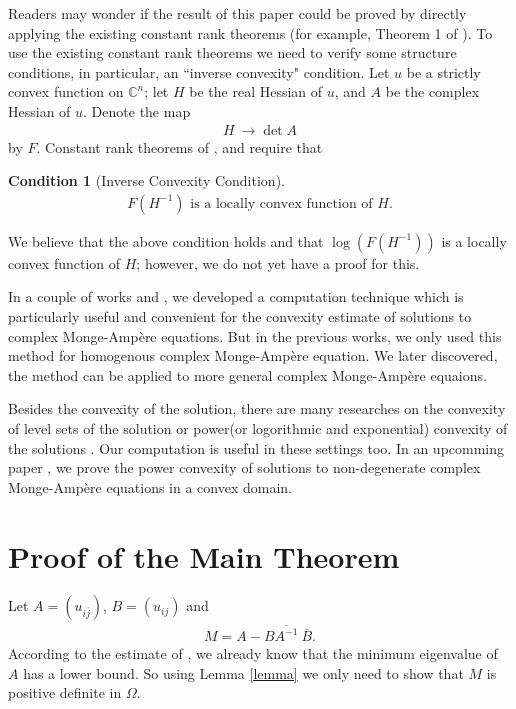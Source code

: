 \documentclass{article}
\numberwithin{equation}{section}
\newtheorem{condition}{Condition}
\newcommand{\EC}{\mathbb{C}}
\newcommand{\ijbar}{{i\overline j}}
\newcommand{\Bbar}{{\overline{B}}}
\newcommand{\Abarinverse}{\overline{A^{-1}}}
\begin{document}
Readers may wonder if the result of this paper could be proved by directly applying the existing constant rank theorems (for example, Theorem 1 of \cite{Caffarelli_Guan_Ma_constantrank}). To use the existing constant rank theorems we need to 
verify some structure conditions, in particular, an ``inverse convexity" condition. Let $u$ be a strictly convex function on $\EC^n$; let $H$ be the real Hessian of $u$, and $A$ be the complex Hessian of $u$.  Denote the map 
\begin{align}
H\ \rightarrow \det{A}
\end{align} by $F$. Constant rank theorems of  \cite{Caffarelli_Guan_Ma_constantrank}, \cite{BianGuan09_Invention} and \cite{Garbo_Weinkove_ConstantRank} require that
\begin{condition}[Inverse Convexity Condition]
	\begin{align}F(H^{-1}) \text{  \   is a locally convex function of $H$.}
	\end{align}
	\end{condition} We believe that the above condition holds and that $\log(F(H^{-1}) )$ is a locally convex function of 
	$H$; however, we do not yet have a proof for this.
	
	In a couple of works \cite{Hu22Nov} and \cite{HuCConvexity}, we developed a computation technique which is particularly useful and convenient for the convexity estimate of solutions to complex Monge-Amp\`ere equations.  But in the previous works, we only used this method for homogenous complex Monge-Amp\`ere equation. We later discovered, the method can be applied to more general complex Monge-Amp\`ere equaions. 
	
	Besides the convexity of the solution, there are many researches on the convexity of level sets of the solution or power(or logorithmic and exponential) convexity of the solutions \cite{BianGuanXuMa} \cite{GuanXu_convexity} \cite{Xinan_Ou_Summary_English} \cite{MXu_PowerConvexity} \cite{XinanMa_Chinese} \cite{Shishujun_Green_LevelSets}. Our computation is useful in these settings too. In an upcomming paper \cite{ChenHongyu}, we prove the power convexity of solutions to non-degenerate complex Monge-Amp\`ere equations in a convex domain. 
	


\section{Proof of the Main Theorem}
   Let $A=(u_{\ijbar})$,  $B=(u_{ij})$ and
   \begin{align}
   	M=A-B\Abarinverse \ \Bbar.
   \end{align}
   According to the estimate of \cite{ChengYau_80_KahlerMetric}, we already know that the minimum eigenvalue of  $A$ has a lower bound. So using Lemma \ref{lemma} we only need to show that $M$ is positive definite in $\Omega$. 
   
\end{document}
